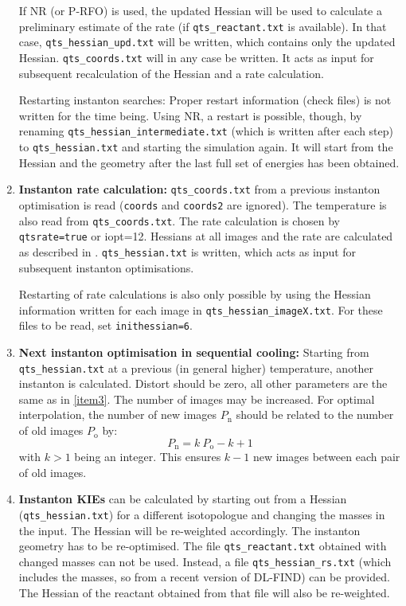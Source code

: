 \documentclass{article}
\begin{document}
\begin{enumerate}
  If NR (or P-RFO) is used, the updated Hessian will be used to
  calculate a preliminary estimate of the rate (if
  \texttt{qts\_reactant.txt} is available). In that case,
  \texttt{qts\_hessian\_upd.txt} will be written, which contains only
  the updated Hessian. \texttt{qts\_coords.txt} will in any case be
  written. It acts as input for subsequent recalculation of the
  Hessian and a rate calculation.

  Restarting instanton searches: Proper restart information (check files) is
  not written for the time being. Using NR, a restart is possible, though, by
  renaming \texttt{qts\_hessian\_intermediate.txt} (which is written after
  each step) to \texttt{qts\_hessian.txt} and starting the simulation
  again. It will start from the Hessian and the geometry after the last full
  set of energies has been obtained.

\item \textbf{Instanton rate calculation:} \texttt{qts\_coords.txt}
  from a previous instanton optimisation is read (\texttt{coords} and
  \texttt{coords2} are ignored). The temperature is also read from
  \texttt{qts\_coords.txt}. The rate calculation is chosen by
  \texttt{qtsrate=true} or iopt=12. Hessians at all images and the
  rate are calculated as described in
  \cite{rom11b}. \texttt{qts\_hessian.txt} is written, which acts as
  input for subsequent instanton optimisations.

  Restarting of rate calculations is also only possible by using the
  Hessian information written for each image in
  \texttt{qts\_hessian\_imageX.txt}. For these files to be read, set
  \texttt{inithessian=6}.

\item \textbf{Next instanton optimisation in sequential cooling:} Starting from
  \texttt{qts\_hessian.txt} at a previous (in general higher) temperature,
  another instanton is calculated. Distort should be zero, all other
  parameters are the same as in \ref{item3}. The number of images may be
  increased. For optimal interpolation, the number of new images
  $P_\mathrm{n}$ should be related to the number of old images $P_\mathrm{o}$
  by:
  \begin{equation}
    P_\mathrm{n}=k\ P_\mathrm{o} - k + 1
  \end{equation}
  with $k>1$ being an integer. This ensures $k-1$ new images between each pair
  of old images.

\item \textbf{Instanton KIEs} can be calculated by starting out from a Hessian
  (\texttt{qts\_hessian.txt}) for a different isotopologue and
  changing the masses in the input. The Hessian will be re-weighted
  accordingly. The instanton geometry has to be re-optimised. The file
  \texttt{qts\_reactant.txt} obtained with
  changed masses can not be used. Instead, a file
  \texttt{qts\_hessian\_rs.txt} (which includes the masses, so from a
  recent version of DL-FIND) can be provided. The Hessian of the
  reactant obtained from that file will also be re-weighted.


\end{enumerate}
\end{document}
